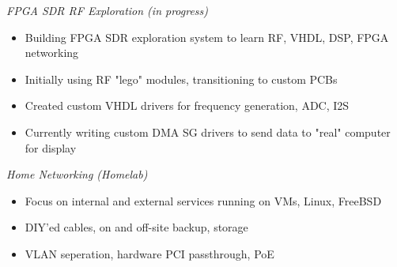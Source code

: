 \documentclass[line,mmmargin]{res}
\begin{document}
\begin{resume}
    {\sl FPGA SDR RF Exploration (in progress)}
		\begin{itemize} \itemsep -2pt
			\item Building FPGA SDR exploration system to learn RF, VHDL, DSP, FPGA networking
            \item Initially using RF "lego" modules, transitioning to custom PCBs
            \item Created custom VHDL drivers for frequency generation, ADC, I2S
            \item Currently writing custom DMA SG drivers to send data to "real" computer for display
		\end{itemize}
	\vspace{-10pt}
    {\sl Home Networking (Homelab)}
		\begin{itemize} \itemsep -2pt
			\item Focus on internal and external services running on VMs, Linux, FreeBSD
            \item DIY'ed cables, on and off-site backup, storage
            \item VLAN seperation, hardware PCI passthrough, PoE
		\end{itemize}

\end{resume}
\end{document}
